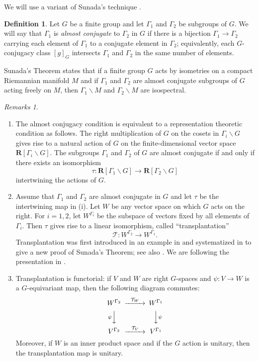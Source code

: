 \documentclass[12pt,leqno]{amsart}%
\theoremstyle{definition}
\newtheorem{definition}[theorem]{Definition}
\theoremstyle{remark}
\newtheorem{remarks}[theorem]{Remarks}
\numberwithin{equation}{section}
\def\G{{\Gamma}}
\def\go{{\G_1}}
\def\gt{{\G_2}}
\begin{document}
We will use a variant of Sunada's technique \cite{Su}.

\begin{definition}
\label{def.ac} Let $G$ be a finite group and let ${{\Gamma}_{1}}$ and
${{\Gamma}_{2}}$ be subgroups of $G$. We will say that ${{\Gamma}_{1}}$ is
\emph{almost conjugate} to ${{\Gamma}_{2}}$ in $G$ if
there is a bijection $\Gamma_1\to\Gamma_2$ carrying each element of $\Gamma_1$
to a conjugate element in $\Gamma_2$; equivalently,
each $G$-conjugacy class
$[g]_{G}$ intersects ${{\Gamma}_{1}}$ and ${{\Gamma}_{2}}$ in the same number of
elements.
\end{definition}

Sunada's Theorem states that if a finite group $G$ acts by isometries on a
compact Riemannian manifold $M$ and if ${{\Gamma}_{1}}$ and ${{\Gamma}_{2}}$ are
almost conjugate subgroups of $G$ acting freely on $M$, then
${{\Gamma}_{1}}\backslash M$ and ${{\Gamma}_{2}}\backslash M$ are isospectral.

\begin{remarks}\label{rem.repcond}$\text{ }$

\begin{enumerate}
\item The almost conjugacy condition is equivalent to a
representation theoretic condition as follows. The right multiplication of $G$
on the cosets in ${\Gamma}_{i}{\backslash} G$ gives rise to a natural action of
$G$ on the finite-dimensional vector space
${\mathbf{R}}[{\Gamma}_{i}{\backslash} G]$. The subgroups ${{\Gamma}_{1}}$ and
${{\Gamma}_{2}}$ of $G$ are almost conjugate if and only if there exists an
isomorphism
\[
\tau: {\mathbf{R}}[{{\Gamma}_{1}}{\backslash} G]\to{\mathbf{R}}[{{\Gamma}_{2}
}{\backslash} G]
\]
intertwining the actions of $G$.

\item Assume that ${{\Gamma}_{1}}$ and ${{\Gamma}_{2}}$ are almost conjugate in
$G$ and let $\tau$ be the intertwining map in (i). Let $W$ be any vector space
on which $G$ acts on the right. For $i=1,2$, let $W^{{\Gamma}_{i}}$ be the
subspace of vectors fixed by all elements of ${\Gamma}_{i}$. Then $\tau$ gives
rise to a linear isomorphism, called ``transplantation''
\[
\mathcal{T}:W^{{{\Gamma}_{2}}}\to W^{{{\Gamma}_{1}}}.
\]
Transplantation was first introduced in an example in \cite{Bu86} and
systematized in \cite{Be92} to give a new proof of Sunada's Theorem; see also
\cite{Z}. We are following the presentation in \cite{GMW}.

\item Transplantation is functorial: if $V$ and $W$ are right
$G$-spaces and $\psi:V\to W$ is a $G$-equivariant map, then the following
diagram commutes:
\[
\begin{CD}
W^{\gt} @>{\mathcal{T}_W}>> W^{\go} \\
@V{\psi}VV                 @VV{\psi}V \\
V^{\gt} @>{\mathcal{T}_V}>> V^{\go}\\
\end{CD}
\]
Moreover, if $W$ is an inner product space and if the $G$ action is unitary,
then the transplantation map is unitary.
\end{enumerate}
\end{remarks}
\end{document}
